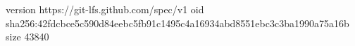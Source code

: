 version https://git-lfs.github.com/spec/v1
oid sha256:42fdcbce5c590d84eebc5fb91c1495c4a16934abd8551ebc3c3ba1990a75a16b
size 43840
